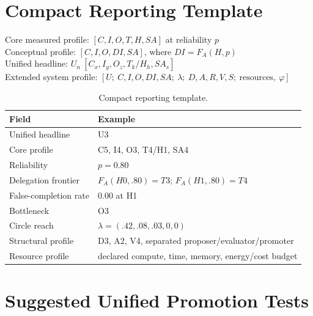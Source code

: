 \documentclass[11pt]{article}
\theoremstyle{definition}
\newcommand{\FA}{\ensuremath{F_A(H,p)}}
\begin{document}
\section{Compact Reporting Template}

\begin{center}
Core measured profile: $[C, I, O, T, H, SA]$ at reliability $p$\\
Conceptual profile: $[C, I, O, DI, SA]$, where $DI = \FA{}$\\
Unified headline: $U_n\ [C_x, I_y, O_z, T_k/H_h, SA_s]$\\
Extended system profile: $[U;\ C,I,O,DI,SA;\ \lambda;\ D,A,R,V,S;\ \text{resources},\ \varphi]$
\end{center}

\begin{table}[!htbp]
\centering\small
\begin{tabularx}{\textwidth}{@{}lY@{}}
\toprule
Field & Example \\
\midrule
Unified headline & U3 \\
Core profile & C5, I4, O3, T4/H1, SA4 \\
Reliability & $p = 0.80$ \\
Delegation frontier & $F_A(H0,.80)=T3$; $F_A(H1,.80)=T4$ \\
False-completion rate \emph{} & 0.00 at H1 \\
Bottleneck & O3 \\
Circle reach & $\lambda = (.42,.08,.03,0,0)$ \\
Structural profile & D3, A2, V4, separated proposer/evaluator/promoter \\
Resource profile & declared compute, time, memory, energy/cost budget \\
\bottomrule
\end{tabularx}
\caption{Compact reporting template.}
\label{tab:template}
\end{table}

\section{Suggested Unified Promotion Tests}
\end{document}
